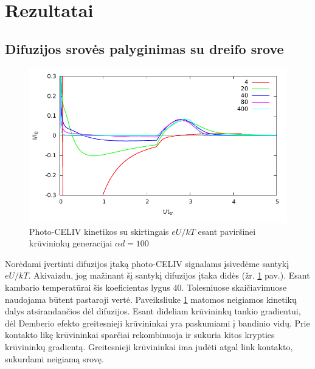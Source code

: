 \section{Rezultatai}

\subsection{Difuzijos srovės palyginimas su dreifo srove}

\begin{figure}[htb]
  \centering
    \includegraphics{./media/pdf/diff_drift.pdf}
  \caption{Photo-CELIV kinetikos su skirtingais $eU/kT$ esant paviršinei krūvininkų generacijai $\alpha d = 100$}
  \label{fig:comp}
\end{figure}

Norėdami įvertinti difuzijos įtaką photo-CELIV signalams įsivedėme santykį $eU/kT$. Akivaizdu, jog mažinant šį santykį difuzijos įtaka didės (žr. \ref{fig:comp} pav.). Esant kambario temperatūrai šis koeficientas lygus $40$. Tolesniuose skaičiavimuose naudojama būtent pastaroji vertė.
Paveiksliuke \ref{fig:comp} matomos neigiamos kinetikų dalys atsirandančios dėl difuzijos. Esant dideliam krūvininkų tankio gradientui, dėl Demberio efekto greitesnieji krūvininkai yra paskumiami į bandinio vidų. Prie kontakto likę krūvininkai sparčiai rekombinuoja ir sukuria kitos krypties krūvininkų gradientą. Greitesnieji krūvininkai ima judėti atgal link kontakto, sukurdami neigiamą srovę.

